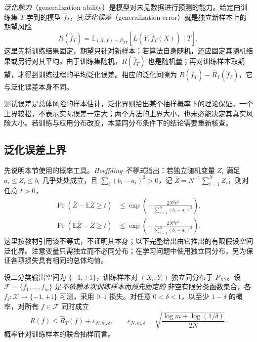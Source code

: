\emph{泛化能力}（generalization ability）是模型对未见数据进行预测的能力。给定由训练集 $T$ 学到的模型 $\widehat f_T$，其\emph{泛化误差}（generalization error）就是独立新样本上的期望风险
\begin{equation}
    R(\widehat f_T)
      =\mathbb E_{(X,Y)\sim P_{XY}}
          [L(Y,\widehat f_T(X))\mid T],
    \label{eq:lh-generalization-error}
\end{equation}
这里先将训练结果固定，期望只针对新样本；若算法自身随机，还应固定其随机结果或另行对其平均。由于训练集随机，$R(\widehat f_T)$ 也是随机量；再对训练样本取期望，才得到训练过程的平均泛化误差。相应的泛化间隙为 $R(\widehat f_T)-\widehat R_T(\widehat f_T)$，它与泛化误差本身不同。

测试误差是总体风险的样本估计，泛化界则给出某个抽样概率下的理论保证。一个上界较松，不表示实际误差一定大；两个方法的上界大小，也未必能决定其真实风险大小。若训练与应用分布改变，本章同分布条件下的结论需要重新核查。

\subsection{泛化误差上界}
\label{subsec:lh-generalization-bound}

先说明本节使用的概率工具。\emph{Hoeffding 不等式}指出：若独立随机变量 $Z_i$ 满足 $a_i\leq Z_i\leq b_i$ 几乎处处成立，且 $\sum_i(b_i-a_i)^2>0$，记 $\overline Z=N^{-1}\sum_{i=1}^N Z_i$，则对任意 $t>0$，
\begin{align}
    \Pr(\overline Z-\mathbb E\overline Z\geq t)
       &\leq\exp\!\left(-\frac{2N^2t^2}{\sum_{i=1}^N(b_i-a_i)^2}\right),
       \label{eq:lh-hoeffding-upper}\\
    \Pr(\mathbb E\overline Z-\overline Z\geq t)
       &\leq\exp\!\left(-\frac{2N^2t^2}{\sum_{i=1}^N(b_i-a_i)^2}\right).
       \label{eq:lh-hoeffding-lower}
\end{align}
这里按教材引用该不等式，不证明其本身；以下完整给出由它推出的有限假设空间泛化界。注意变量只需独立而不必同分布；在学习问题中使用独立同分布，另为保证各项损失具有相同的总体均值。

\begin{theorem}[有限假设空间的泛化界]
\label{thm:lh-finite-generalization}
设二分类输出空间为 $\{-1,+1\}$，训练样本对 $(X_i,Y_i)$ 独立同分布于 $P_{XY}$。设 $\mathcal F=\{f_1,\ldots,f_m\}$ 是\emph{不依赖本次训练样本而预先固定的} 非空有限分类函数集合，各 $f_j:\mathcal X\to\{-1,+1\}$ 可测，采用 $0$--$1$ 损失。对任意 $0<\delta<1$，以至少 $1-\delta$ 的概率，对所有 $f\in\mathcal F$ 同时成立
\begin{equation}
    R(f)\leq\widehat R_T(f)+\varepsilon_{N,m,\delta},
    \qquad
    \varepsilon_{N,m,\delta}
       =\sqrt{\frac{\log m+\log(1/\delta)}{2N}}.
    \label{eq:lh-finite-generalization-bound}
\end{equation}
概率针对训练样本的联合抽样而言。
\end{theorem}

